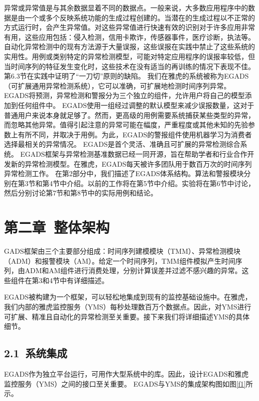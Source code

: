 \documentclass[a4paper,AutoFakeBold,oneside,12pt]{book}
\begin{document}
异常或异常值是与其余数据显着不同的数据点。一般来说，大多数应用程序中的数据是由一个或多个反映系统功能的生成过程创建的。当潜在的生成过程以不正常的方式运行时，会产生异常值。对这些异常值进行快速有效的识别对于许多应用非常有用，这些应用包括：侵入检测，信用卡欺诈，传感器事件，医疗诊断，执法等。
自动化异常检测中的现有方法源于大量误报，这些误报在实践中禁止了这些系统的实用性。用例或类别特定的异常检测模型，可能对特定应用程序的误报率较低，但当时间序列的特征发生变化时，这些技术在没有适当的再训练的情况下表现不佳。第6.3节在实践中证明了“一刀切”原则的缺陷。
我们在雅虎的系统被称为EGADS（可扩展通用异常检测系统），它可以准确，可扩展地检测时间序列异常。 EGADS将预测，异常检测和警报分为三个独立的组件，允许用户将自己的模型添加到任何组件中。
EGADS使用一组经过调整的默认模型来减少误报数量，这对于普通用户来说本身就足够了。然而，更高级的用例需要系统捕获某些类型的异常，而忽略其他异常。值得引起注意的异常可能在幅度，严重程度或其他未知的先验参数上有所不同，并取决于用例。为此，EGADS的警报组件使用机器学习为消费者选择最相关的异常情况。
EGADS是首个灵活、准确且可扩展的异常检测综合系统。 EGADS框架与异常检测基准数据已经一同开源，旨在帮助学者和行业合作开发新的异常检测模型。在雅虎，EGADS每天被许多团队用于数百万次的时间序列异常检测工作。
在第2部分中，我们描述了EGADS体系结构。算法和警报模块分别在第3节和第4节中介绍。以前的工作将在第5节中介绍。实验将在第6节中讨论，然后分别讨论第7节和第8节中的实际用例和结论。

\chapter*{第二章\ 整体架构}
GADS框架由三个主要部分组成：时间序列建模模块（TMM）、异常检测模块（ADM）和报警模块（AM）。给定一个时间序列，TMM组件模拟产生时间序列，由ADM和AM组件进行消费处理，分别计算误差并过滤不感兴趣的异常。这些组件在第3和4节中有详细描述。

EGADS被构建为一个框架，可以轻松地集成到现有的监控基础设施中。在雅虎，我们内部的雅虎监控服务（YMS）每秒处理数百万个数据点。因此，对YMS进行可扩展、精准且自动化的异常检测至关重要。接下来我们将详细描述YMS的具体细节。

\section*{2.1\ 系统集成}
EGADS作为独立平台运行，可用作大型系统中的库。因此，设计EGADS和雅虎监控服务（YMS）之间的接口至关重要。 EGADS与YMS的集成架构图如图\ref{f1}所示。

\end{document}
